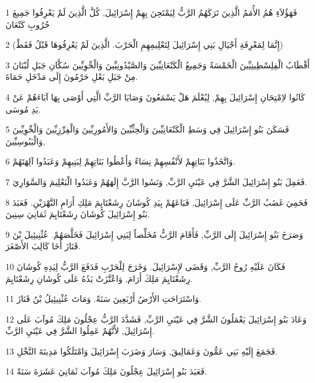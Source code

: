 \par 1 فَهَؤُلاَءِ هُمُ الأُمَمُ الَّذِينَ تَرَكَهُمُ الرَّبُّ لِيَمْتَحِنَ بِهِمْ إِسْرَائِيلَ, كُلَّ الَّذِينَ لَمْ يَعْرِفُوا جَمِيعَ حُرُوبِ كَنْعَانَ
\par 2 (إِنَّمَا لِمَعْرِفَةِ أَجْيَالِ بَنِي إِسْرَائِيلَ لِتَعْلِيمِهِمِ الْحَرْبَ. الَّذِينَ لَمْ يَعْرِفُوهَا قَبْلُ فَقَطْ)
\par 3 أَقْطَابُ الْفِلِسْطِينِيِّينَ الْخَمْسَةُ وَجَمِيعُ الْكَنْعَانِيِّينَ وَالصَّيْدُونِيِّينَ وَالْحِّوِيِّينَ سُكَّانِ جَبَلِ لُبْنَانَ مِنْ جَبَلِ بَعْلِ حَرْمُونَ إِلَى مَدْخَلِ حَمَاةَ.
\par 4 كَانُوا لاِمْتِحَانِ إِسْرَائِيلَ بِهِمْ, لِيُعْلَمَ هَلْ يَسْمَعُونَ وَصَايَا الرَّبِّ الَّتِي أَوْصَى بِهَا آبَاءَهُمْ عَنْ يَدِ مُوسَى.
\par 5 فَسَكَنَ بَنُو إِسْرَائِيلَ فِي وَسَطِ الْكَنْعَانِيِّينَ وَالْحِثِّيِّينَ وَالأَمُورِيِّينَ وَالْفِرِّزِيِّينَ وَالْحِّوِيِّينَ وَالْيَبُوسِيِّينَ,
\par 6 وَاتَّخَذُوا بَنَاتِهِمْ لأَنْفُسِهِمْ نِسَاءً وَأَعْطُوا بَنَاتِهِمْ لِبَنِيهِمْ وَعَبَدُوا آلِهَتَهُمْ.
\par 7 فَعَمِلَ بَنُو إِسْرَائِيلَ الشَّرَّ فِي عَيْنَيِ الرَّبِّ, وَنَسُوا الرَّبَّ إِلَهَهُمْ وَعَبَدُوا الْبَعْلِيمَ وَالسَّوَارِيَ.
\par 8 فَحَمِيَ غَضَبُ الرَّبِّ عَلَى إِسْرَائِيلَ, فَبَاعَهُمْ بِيَدِ كُوشَانَ رِشَعْتَايِمَ مَلِكِ أَرَامِ النَّهْرَيْنِ. فَعَبَدَ بَنُو إِسْرَائِيلَ كُوشَانَ رِشَعْتَايِمَ ثَمَانِيَ سِنِينَ.
\par 9 وَصَرَخَ بَنُو إِسْرَائِيلَ إِلَى الرَّبِّ, فَأَقَامَ الرَّبُّ مُخَلِّصاً لِبَنِي إِسْرَائِيلَ فَخَلَّصَهُمْ. عُثْنِيئِيلَ بْنَ قَنَازَ أَخَا كَالِبَ الأَصْغَرَ.
\par 10 فَكَانَ عَلَيْهِ رُوحُ الرَّبِّ, وَقَضَى لإِسْرَائِيلَ. وَخَرَجَ لِلْحَرْبِ فَدَفَعَ الرَّبُّ لِيَدِهِ كُوشَانَ رِشَعْتَايِمَ مَلِكَ أَرَامَ, وَاعْتَّزَتْ يَدُهُ عَلَى كُوشَانِ رِشَعْتَايِمَ.
\par 11 وَاسْتَرَاحَتِ الأَرْضُ أَرْبَعِينَ سَنَةً. وَمَاتَ عُثْنِيئِيلُ بْنُ قَنَازَ.
\par 12 وَعَادَ بَنُو إِسْرَائِيلَ يَعْمَلُونَ الشَّرَّ فِي عَيْنَيِ الرَّبِّ, فَشَدَّدَ الرَّبُّ عِجْلُونَ مَلِكَ مُوآبَ عَلَى إِسْرَائِيلَ, لأَنَّهُمْ عَمِلُوا الشَّرَّ فِي عَيْنَيِ الرَّبِّ.
\par 13 فَجَمَعَ إِلَيْهِ بَنِي عَمُّونَ وَعَمَالِيقَ, وَسَارَ وَضَرَبَ إِسْرَائِيلَ وَامْتَلَكُوا مَدِينَةَ النَّخْلِ.
\par 14 فَعَبَدَ بَنُو إِسْرَائِيلَ عِجْلُونَ مَلِكَ مُوآبَ ثَمَانِيَ عَشَرَةَ سَنَةً.
